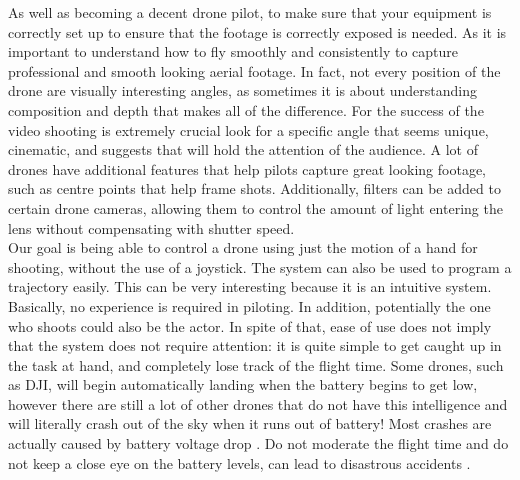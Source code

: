 \noindent As well as becoming a decent drone pilot, to make sure that your equipment is correctly set up to ensure that the footage is correctly exposed is needed. As it is important to understand how to fly smoothly and consistently to capture professional and smooth looking aerial footage. In fact, not every position of the drone are visually interesting angles, as sometimes it is about understanding composition and depth that makes all of the difference. For the success of the video shooting is extremely crucial look for a specific angle that seems unique, cinematic, and suggests that will hold the attention of the audience. A lot of drones have additional features that help pilots capture great looking footage, such as centre points that help frame shots. Additionally, filters can be added to certain drone cameras, allowing them to control the amount of light entering the lens without compensating with shutter speed. \\

\noindent Our goal is being able to control a drone using just the motion of a hand for shooting, without the use of a joystick. The system can also be used to program a trajectory easily. This can be very interesting because it is an intuitive system. Basically, no experience is required in piloting. In addition, potentially the one who shoots could also be the actor. In spite of that, ease of use does not imply that the system does not require attention: it is quite simple to get caught up in the task at hand, and completely lose track of the flight time. Some drones, such as DJI, will begin automatically landing when the battery begins to get low, however there are still a lot of other drones that do not have this intelligence and will literally crash out of the sky when it runs out of battery! Most crashes are actually caused by battery voltage drop \cite[]{WhatHapp70:online}. Do not moderate the flight time and do not keep a close eye on the battery levels, can lead to disastrous accidents \cite[]{ListofUA81:online}. \\

